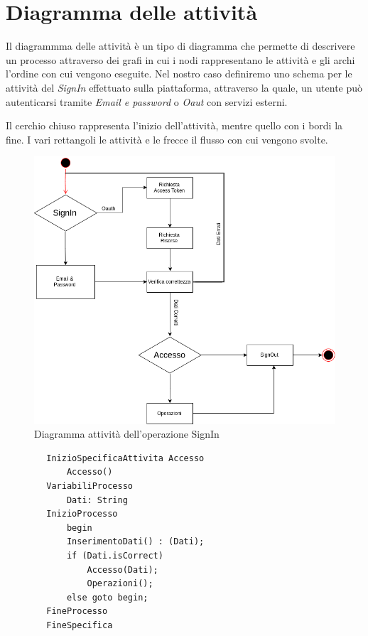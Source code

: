 	\section{Diagramma delle attività}
	Il diagrammma delle attività è un tipo di diagramma che permette di descrivere un processo attraverso dei grafi in cui i nodi rappresentano le attività e gli archi l'ordine con cui vengono eseguite. Nel nostro caso definiremo uno schema per le attività del \textit{SignIn} effettuato sulla piattaforma, attraverso la quale, un utente può autenticarsi tramite \textit{Email e password} o \textit{Oaut} con servizi esterni.
	
	Il cerchio chiuso rappresenta l'inizio dell'attività, mentre quello con i bordi la fine. I vari rettangoli le attività e le frecce il flusso con cui vengono svolte.

	\begin{figure}[H]
		\includegraphics[width=\textwidth]{./media/DiagrammaAttivita.png}
		\caption{Diagramma attività dell'operazione SignIn}
	\end{figure}

	\begin{lstlisting}
		InizioSpecificaAttivita Accesso
			Accesso()
		VariabiliProcesso
			Dati: String
		InizioProcesso
			begin
			InserimentoDati() : (Dati);
			if (Dati.isCorrect)
				Accesso(Dati);
				Operazioni();
			else goto begin;
		FineProcesso
		FineSpecifica
	\end{lstlisting}